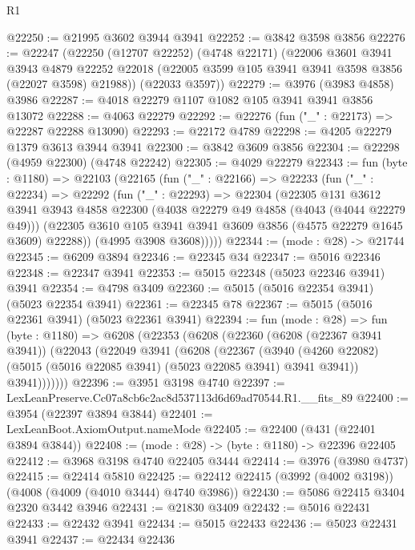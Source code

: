 \begin{lexlean}{R1}
\begin{coremodule}
@22250 := @21995 @3602 @3944 @3941
@22252 := @3842 @3598 @3856
@22276 := @22247
    (@22250
      (@12707 @22252)
      (@4748 @22171)
      (@22006
        @3601
        @3941
        @3943
        @4879
        @22252
        @22018
        (@22005 @3599 @105 @3941 @3941 @3598 @3856 (@22027 @3598) @21988))
      (@22033 @3597))
@22279 := @3976 (@3983 @4858) @3986
@22287 := @4018 @22279 @1107 @1082 @105 @3941 @3941 @3856 @13072
@22288 := @4063 @22279
@22292 := @22276 (fun ("_" : @22173) => @22287 @22288 @13090)
@22293 := @22172 @4789
@22298 := @4205 @22279 @1379 @3613 @3944 @3941
@22300 := @3842 @3609 @3856
@22304 := @22298 (@4959 @22300) (@4748 @22242)
@22305 := @4029 @22279
@22343 := fun (byte : @1180) =>
  @22103
    (@22165
      (fun ("_" : @22166) =>
      @22233
        (fun ("_" : @22234) =>
        @22292
          (fun ("_" : @22293) =>
          @22304
            (@22305
              @131
              @3612
              @3941
              @3943
              @4858
              @22300
              (@4038 @22279 @49 @4858 (@4043 (@4044 @22279 @49)))
              (@22305 @3610 @105 @3941 @3941 @3609 @3856 (@4575 @22279 @1645 @3609) @22288))
            (@4995 @3908 @3608)))))
@22344 := (mode : @28) -> @21744
@22345 := @6209 @3894
@22346 := @22345 @34
@22347 := @5016 @22346
@22348 := @22347 @3941
@22353 := @5015 @22348 (@5023 @22346 @3941) @3941
@22354 := @4798 @3409
@22360 := @5015 (@5016 @22354 @3941) (@5023 @22354 @3941)
@22361 := @22345 @78
@22367 := @5015 (@5016 @22361 @3941) (@5023 @22361 @3941)
@22394 := fun (mode : @28) =>
  fun (byte : @1180) =>
  @6208
    (@22353
      (@6208
        (@22360
          (@6208 (@22367 @3941 @3941))
          (@22043
            (@22049
              @3941
              (@6208
                (@22367
                  (@3940
                    (@4260 @22082)
                    (@5015 (@5016 @22085 @3941) (@5023 @22085 @3941) @3941 @3941))
                  @3941)))))))
@22396 := @3951 @3198 @4740
@22397 := LexLeanPreserve.Cc07a8cb6c2ac8d537113d6d69ad70544.R1.__fits_89
@22400 := @3954 (@22397 @3894 @3844)
@22401 := LexLeanBoot.AxiomOutput.nameMode
@22405 := @22400 (@431 (@22401 @3894 @3844))
@22408 := (mode : @28) -> (byte : @1180) -> @22396 @22405
@22412 := @3968 @3198 @4740 @22405 @3444
@22414 := @3976 (@3980 @4737)
@22415 := @22414 @5810
@22425 := @22412 @22415 (@3992 (@4002 @3198)) (@4008 (@4009 (@4010 @3444) @4740 @3986))
@22430 := @5086 @22415 @3404 @2320 @3442 @3946
@22431 := @21830 @3409
@22432 := @5016 @22431
@22433 := @22432 @3941
@22434 := @5015 @22433
@22436 := @5023 @22431 @3941
@22437 := @22434 @22436

\end{coremodule}
\end{lexlean}
